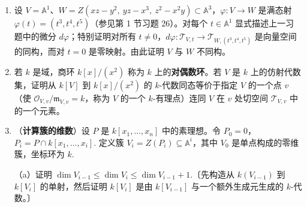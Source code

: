 \begin{enumerate}
（b）证明若 \(V \subseteq \mathbb{A}^n\)、\(W \subseteq \mathbb{A}^m\) 且 \(\varphi = (F_1(x_1, \ldots, x_n), \ldots, F_m(x_1, \ldots, x_n))\)，则 \(d\varphi : \mathcal{T}_{V,v} \to \mathcal{T}_{W,w}\) 由
\[
(d\varphi)(a_1, \ldots, a_n) = (D_v(F_1)(a_1, \ldots, a_n), \ldots, D_v(F_m)(a_1, \ldots, a_n))
\]
显式给出。〔若 \(g = g(y_1, \ldots, y_m)\)，证明链法则蕴涵
\[
\frac{\partial(g\circ\varphi)}{\partial x_i}(v) = \sum_{j=1}^{m}\frac{\partial g}{\partial y_j}(w)\frac{\partial F_j}{\partial x_i}(v),
\]
故 \(D_v(g\circ\varphi)(a_1, \ldots, a_n) = D_w(g)(b_1, \ldots, b_m)\)，其中 \(b_j = D_v(F_j)(a_1, \ldots, a_n)\). 然后利用若 \(g \in I(W)\) 则 \(g\circ\varphi \in I(V)\) 这一事实。〕

（c）若 \(\psi : U \to V\) 是另一个满足 \(\psi(u) = v\) 的态射，证明相应的 \(d(\varphi \circ \psi) : \mathcal{T}_{U,u} \to \mathcal{T}_{W,w}\) 等于 \(d\varphi \circ d\psi\).

（d）证明若 \(\varphi\) 是同构，则对每个满足 \(\varphi(v) = w\) 的 \(v\)，\(d\varphi\) 是从 \(\mathcal{T}_{V,v}\) 到 \(\mathcal{T}_{W,w}\) 的向量空间同构。

\item 设 \(V = \mathbb{A}^1\)、\(W = Z(xz-y^2,\ yz-x^3,\ z^2-x^2y) \subset \mathbb{A}^3\)，\(\varphi : V \to W\) 是满态射 \(\varphi(t) = (t^3, t^4, t^5)\)（参见第 1 节习题 26）。对每个 \(t \in \mathbb{A}^1\) 显式描述上一习题中的微分 \(d\varphi\)；特别证明对所有 \(t \neq 0\)，\(d\varphi : \mathcal{T}_{V,t} \to \mathcal{T}_{W,(t^3,t^4,t^5)}\) 是向量空间的同构，而对 \(t = 0\) 是零映射。由此证明 \(V\) 与 \(W\) 不同构。

\item 若 \(k\) 是域，商环 \(k[x]/(x^2)\) 称为 \(k\) 上的\textbf{对偶数环}。若 \(V\) 是 \(k\) 上的仿射代数集，证明从 \(k[V]\) 到 \(k[x]/(x^2)\) 的 \(k\)-代数同态等价于指定 \(V\) 的一个点 \(v\)（使 \(\mathcal{O}_{V,v}/\mathfrak{m}_{V,v} = k\)，称为 \(V\) 的一个 \(k\)-有理点）连同 \(V\) 在 \(v\) 处切空间 \(\mathcal{T}_{V,v}\) 中的一个元素。

\item （\textbf{计算簇的维数}）设 \(P\) 是 \(k[x_1, \ldots, x_n]\) 中的素理想。令 \(P_0 = 0\)，\(P_i = P \cap k[x_1, \ldots, x_i]\). 定义簇 \(V_i = Z(P_i) \subseteq \mathbb{A}^i\)，其中 \(V_0\) 是单点构成的零维簇，坐标环为 \(k\).

（a）证明 \(\dim V_{i-1} \leq \dim V_i \leq \dim V_{i-1}+1\).〔先构造从 \(k(V_{i-1})\) 到 \(k[V_i]\) 的单射，然后证明 \(k[V_i]\) 是由 \(k[V_{i-1}]\) 与一个额外生成元生成的 \(k\)-代数。〕


\end{enumerate}
